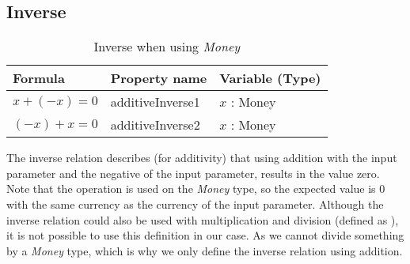 \subsection*{Inverse}
\label{ssct:properties_inverse}
\begin{table}[!ht]
\centering
\begin{tabular}{lll}
\hline
                        \textbf{Formula}    & \textbf{Property name} & \textbf{Variable (Type)} \\ \hline
\rowcolor[HTML]{EFEFEF} $x + (-x) = 0$ & additiveInverse1       & $x$ : Money              \\
                        $(-x) + x = 0$ & additiveInverse2       & $x$ : Money              \\ \hline
\end{tabular}
\caption{Inverse when using \textit{Money}}
\label{tbl:ch4_money_inverse}
\end{table}
\FloatBarrier\noindent
The inverse relation describes (for additivity) that using addition with the
input parameter and the negative of the input parameter, results in the value
zero. Note that the operation is used on the \textit{Money} type, so the
expected value is 0 with the same currency as the currency of the input
parameter. Although the inverse relation could also be used with multiplication
and division (defined as ), it is not possible to use this
definition in our case. As we cannot divide something by a \textit{Money}
type, which is why we only define the inverse relation using addition.
\clearpage %
